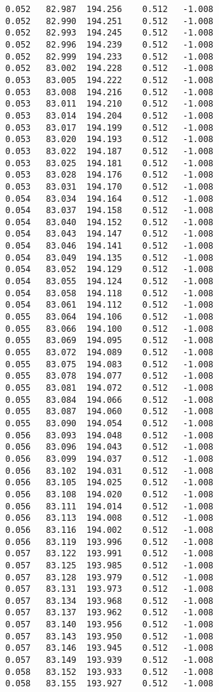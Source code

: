 \begin{verbatim}
   0.052   82.987  194.256    0.512   -1.008
   0.052   82.990  194.251    0.512   -1.008
   0.052   82.993  194.245    0.512   -1.008
   0.052   82.996  194.239    0.512   -1.008
   0.052   82.999  194.233    0.512   -1.008
   0.052   83.002  194.228    0.512   -1.008
   0.053   83.005  194.222    0.512   -1.008
   0.053   83.008  194.216    0.512   -1.008
   0.053   83.011  194.210    0.512   -1.008
   0.053   83.014  194.204    0.512   -1.008
   0.053   83.017  194.199    0.512   -1.008
   0.053   83.020  194.193    0.512   -1.008
   0.053   83.022  194.187    0.512   -1.008
   0.053   83.025  194.181    0.512   -1.008
   0.053   83.028  194.176    0.512   -1.008
   0.053   83.031  194.170    0.512   -1.008
   0.054   83.034  194.164    0.512   -1.008
   0.054   83.037  194.158    0.512   -1.008
   0.054   83.040  194.152    0.512   -1.008
   0.054   83.043  194.147    0.512   -1.008
   0.054   83.046  194.141    0.512   -1.008
   0.054   83.049  194.135    0.512   -1.008
   0.054   83.052  194.129    0.512   -1.008
   0.054   83.055  194.124    0.512   -1.008
   0.054   83.058  194.118    0.512   -1.008
   0.054   83.061  194.112    0.512   -1.008
   0.055   83.064  194.106    0.512   -1.008
   0.055   83.066  194.100    0.512   -1.008
   0.055   83.069  194.095    0.512   -1.008
   0.055   83.072  194.089    0.512   -1.008
   0.055   83.075  194.083    0.512   -1.008
   0.055   83.078  194.077    0.512   -1.008
   0.055   83.081  194.072    0.512   -1.008
   0.055   83.084  194.066    0.512   -1.008
   0.055   83.087  194.060    0.512   -1.008
   0.055   83.090  194.054    0.512   -1.008
   0.056   83.093  194.048    0.512   -1.008
   0.056   83.096  194.043    0.512   -1.008
   0.056   83.099  194.037    0.512   -1.008
   0.056   83.102  194.031    0.512   -1.008
   0.056   83.105  194.025    0.512   -1.008
   0.056   83.108  194.020    0.512   -1.008
   0.056   83.111  194.014    0.512   -1.008
   0.056   83.113  194.008    0.512   -1.008
   0.056   83.116  194.002    0.512   -1.008
   0.056   83.119  193.996    0.512   -1.008
   0.057   83.122  193.991    0.512   -1.008
   0.057   83.125  193.985    0.512   -1.008
   0.057   83.128  193.979    0.512   -1.008
   0.057   83.131  193.973    0.512   -1.008
   0.057   83.134  193.968    0.512   -1.008
   0.057   83.137  193.962    0.512   -1.008
   0.057   83.140  193.956    0.512   -1.008
   0.057   83.143  193.950    0.512   -1.008
   0.057   83.146  193.945    0.512   -1.008
   0.057   83.149  193.939    0.512   -1.008
   0.058   83.152  193.933    0.512   -1.008
   0.058   83.155  193.927    0.512   -1.008

\end{verbatim}
